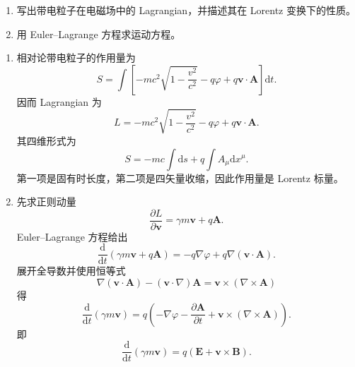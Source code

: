 \begin{question}
\begin{enumerate}
  \item 写出带电粒子在电磁场中的 Lagrangian，并描述其在 Lorentz 变换下的性质。
  \item 用 Euler--Lagrange 方程求运动方程。
\end{enumerate}
\begin{solution}
\begin{enumerate}
  \item 相对论带电粒子的作用量为
  \[
    S=\int\left[-mc^2\sqrt{1-\frac{v^2}{c^2}}-q\varphi+q\mathbf v\cdot\mathbf A\right]\mathrm dt .
  \]
  因而 Lagrangian 为
  \[
    \boxed{L=-mc^2\sqrt{1-\frac{v^2}{c^2}}-q\varphi+q\mathbf v\cdot\mathbf A} .
  \]
  其四维形式为
  \[
    S=-mc\int\mathrm ds+q\int A_\mu\mathrm dx^\mu .
  \]
  第一项是固有时长度，第二项是四矢量收缩，因此作用量是 Lorentz 标量。

  \item 先求正则动量
  \[
    \frac{\partial L}{\partial\mathbf v}=\gamma m\mathbf v+q\mathbf A .
  \]
  Euler--Lagrange 方程给出
  \[
    \frac{\mathrm d}{\mathrm dt}(\gamma m\mathbf v+q\mathbf A)
    =-q\nabla\varphi+q\nabla(\mathbf v\cdot\mathbf A) .
  \]
  展开全导数并使用恒等式
  \[
    \nabla(\mathbf v\cdot\mathbf A)- (\mathbf v\cdot\nabla)\mathbf A
    =\mathbf v\times(\nabla\times\mathbf A)
  \]
  得
  \[
    \frac{\mathrm d}{\mathrm dt}(\gamma m\mathbf v)
    =q\left(-\nabla\varphi-\frac{\partial\mathbf A}{\partial t}
    +\mathbf v\times(\nabla\times\mathbf A)\right).
  \]
  即
  \[
    \boxed{\frac{\mathrm d}{\mathrm dt}(\gamma m\mathbf v)=q(\mathbf E+\mathbf v\times\mathbf B)} .
  \]
\end{enumerate}
\end{solution}
\end{question}

